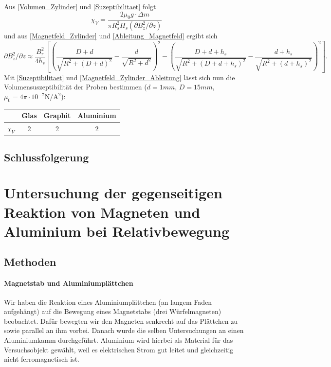 \documentclass[
	a4paper,
	12pt,
	pagesize,
	ngerman
]{scrartcl}
\begin{document}
	Aus \cref{Volumen_Zylinder} und \cref{Suzeptibilitaet} folgt
	\begin{equation}
	\chi_V=\frac{2 \mu_0 g \cdot \Delta m}{\pi R_s^2 H_s(\partial B_z^2 /\partial z)}
	\end{equation}
	und aus \cref{Magnetfeld_Zylinder} und \cref{Ableitung_Magnetfeld} ergibt sich
		\begin{equation}
	\label{Magnetfeld_Zylinder_Ableitung}
	\partial B_z^2 /\partial z \approx \frac{B_r^2}{4h_s} \left[ \left( \frac{D+d}{\sqrt{R^2+(D+d)^2}}-\frac{d}{\sqrt{R^2 +d^2}}\right)^2 -\left( \frac{D+d+h_s}{\sqrt{R^2+(D+d+h_s)^2}} -\frac{d+h_s}{\sqrt{R^2+(d+h_s)^2}} \right)^2  \right].
	\end{equation}
	Mit \cref{Suzeptibilitaet} und \cref{Magnetfeld_Zylinder_Ableitung} lässt sich nun die Volumensuszeptibilität der Proben bestimmen ($d=1 \si{mm}$, $D=15 \si{mm}$, $ \mu_0 = 4 \pi \cdot 10^{-7} \si{\newton \per \ampere \squared}$): \newline
	\begin{tabular}{ r | c | c | c}
		& Glas & Graphit & Aluminium \\ \hline
		$\chi_V \si{}$ & 2 & 2 & 2\\ \hline
	\end{tabular} \newline
	
	\subsection{Schlussfolgerung}
	
	
	\section{Untersuchung der gegenseitigen Reaktion von Magneten und Aluminium bei Relativbewegung}
	\subsection{Methoden}
	\paragraph{Magnetstab und Aluminiumplättchen}
	Wir haben die Reaktion eines Aluminiumplättchen (an langem Faden aufgehängt) auf die Bewegung eines Magnetstabs (drei Würfelmagneten) beobachtet. Dafür bewegten wir den Magneten senkrecht auf das Plättchen zu sowie parallel an ihm vorbei.
	Danach wurde die selben Untersuchungen an einen Aluminiumkamm durchgeführt. Aluminium wird hierbei als Material für das Versuchsobjekt gewählt, weil es elektrischen Strom gut leitet und gleichzeitig nicht ferromagnetisch ist. 
\end{document}
